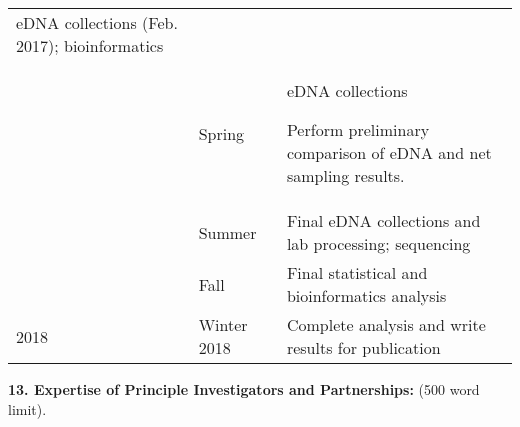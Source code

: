 \documentclass[]{article}
\begin{document}
\begin{longtable}[]{@{}lll@{}}
\begin{minipage}[t]{0.32\columnwidth}
eDNA collections (Feb. 2017); bioinformatics\strut
\end{minipage}\tabularnewline
\begin{minipage}[t]{0.32\columnwidth}\raggedright\strut
\strut
\end{minipage} & \begin{minipage}[t]{0.32\columnwidth}\raggedright\strut
Spring{~}\strut
\end{minipage} & \begin{minipage}[t]{0.32\columnwidth}\raggedright\strut
eDNA collections

Perform preliminary comparison of eDNA and net sampling results.\strut
\end{minipage}\tabularnewline
\begin{minipage}[t]{0.32\columnwidth}\raggedright\strut
\strut
\end{minipage} & \begin{minipage}[t]{0.32\columnwidth}\raggedright\strut
Summer{~}\strut
\end{minipage} & \begin{minipage}[t]{0.32\columnwidth}\raggedright\strut
Final eDNA collections and lab processing; sequencing\strut
\end{minipage}\tabularnewline
\begin{minipage}[t]{0.30\columnwidth}\raggedright\strut
\strut
\end{minipage} & \begin{minipage}[t]{0.30\columnwidth}\raggedright\strut
Fall{~}\strut
\end{minipage} & \begin{minipage}[t]{0.30\columnwidth}\raggedright\strut
Final statistical and bioinformatics analysis{~}\strut
\end{minipage}\tabularnewline
\begin{minipage}[t]{0.30\columnwidth}\raggedright\strut
2018{ }\strut
\end{minipage} & \begin{minipage}[t]{0.30\columnwidth}\raggedright\strut
Winter 2018\strut
\end{minipage} & \begin{minipage}[t]{0.30\columnwidth}\raggedright\strut
Complete analysis and write results for publication\strut
\end{minipage}\tabularnewline
\bottomrule
\end{longtable}

\textbf{13. Expertise of Principle Investigators and Partnerships:} (500
word limit).{~}
\end{document}
